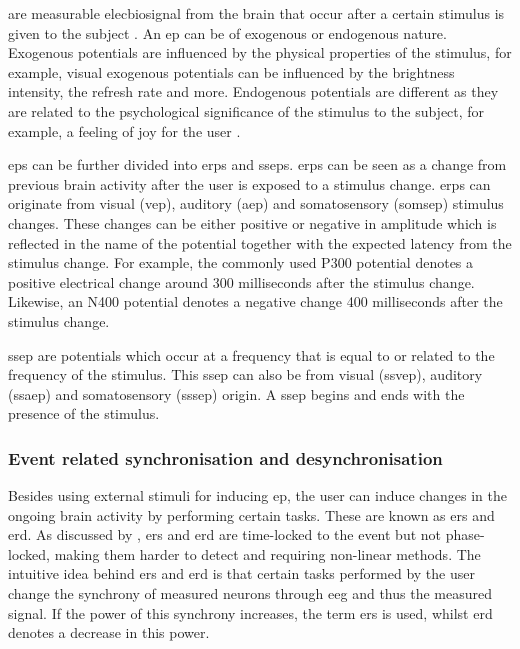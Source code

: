  are measurable \gls{elecbiosignal} from the brain that occur after a certain stimulus is given to the subject \citep{bci_applications}.
An \gls{ep} can be of exogenous or endogenous nature.
Exogenous potentials are influenced by the physical properties of the stimulus, for example, visual exogenous potentials can be influenced by the brightness intensity, the refresh rate and more.
Endogenous potentials are different as they are related to the psychological significance of the stimulus to the subject, for example, a feeling of joy for the user \citep{endog_ep, bci_applications}.

\Glspl{ep} can be further divided into \glspl{erp} and \glspl{ssep}.
\Glspl{erp} can be seen as a change from previous brain activity after the user is exposed to a stimulus change.
\Glspl{erp} can originate from visual (\gls{vep}), auditory (\gls{aep}) and somatosensory (\gls{somsep}) stimulus changes.
These changes can be either positive or negative in amplitude which is reflected in the name of the potential together with the expected latency from the stimulus change.
For example, the commonly used P300 potential denotes a positive electrical change around 300 milliseconds after the stimulus change.
Likewise, an N400 potential denotes a negative change 400 milliseconds after the stimulus change. 

\Gls{ssep} are potentials which occur at a frequency that is equal to or related to the frequency of the stimulus.
This \gls{ssep} can also be from visual (\gls{ssvep}), auditory (\gls{ssaep}) and somatosensory (\gls{sssep}) origin.
A \gls{ssep} begins and ends with the presence of the stimulus.



\subsubsection{Event related synchronisation and desynchronisation}
\label{subsubsec:biomedical_signals_working_with_eeg_inducing_methods_erd}

Besides using external stimuli for inducing \gls{ep}, the user can induce changes in the ongoing brain activity by performing certain tasks.
These are known as \gls{ers} and \gls{erd}.
As discussed by \citet{bci_applications}, \gls{ers} and \gls{erd} are time-locked to the event but not phase-locked, making them harder to detect and requiring non-linear methods.
The intuitive idea behind \gls{ers} and \gls{erd} is that certain tasks performed by the user change the synchrony of measured neurons through \gls{eeg} and thus the measured signal.
If the power of this synchrony increases, the term \gls{ers} is used, whilst \gls{erd} denotes a decrease in this power.

